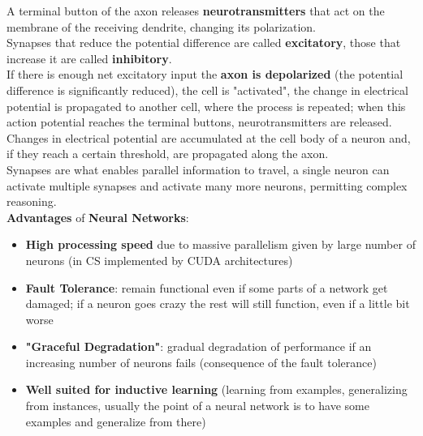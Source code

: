 \documentclass[11pt]{article}
\begin{document}
		A terminal button of the axon releases \textbf{neurotransmitters} that act on the membrane of the receiving dendrite, changing its polarization.\\
		Synapses that reduce the potential difference are called \textbf{excitatory}, those that increase it are called \textbf{inhibitory}.\\
		
		If there is enough net excitatory input the \textbf{axon is depolarized} (the potential difference is significantly reduced), the cell is "activated", the change in electrical potential is propagated to another cell, where the process is repeated; when this action potential reaches the terminal buttons, neurotransmitters are released.\\
		
		Changes in electrical potential are accumulated at the cell body of a neuron and, if they reach a certain threshold, are propagated along the axon.\\
		
		Synapses are what enables parallel information to travel, a single neuron can activate multiple synapses and activate many more neurons, permitting complex reasoning.\\
		
		\textbf{Advantages} of \textbf{Neural Networks}:
		\begin{itemize}
			\item \textbf{High processing speed} due to massive parallelism given by large number of neurons (in CS implemented by CUDA architectures)
			
			\item \textbf{Fault Tolerance}: remain functional even if some parts of a network get damaged; if a neuron goes crazy the rest will still function, even if a little bit worse
			
			\item \textbf{"Graceful Degradation"}: gradual degradation of performance if an increasing number of neurons fails (consequence of the fault tolerance)
			
			\item \textbf{Well suited for inductive learning} (learning from examples, generalizing from instances, usually the point of a neural network is to have some examples and generalize from there)
		\end{itemize}
		
\end{document}
